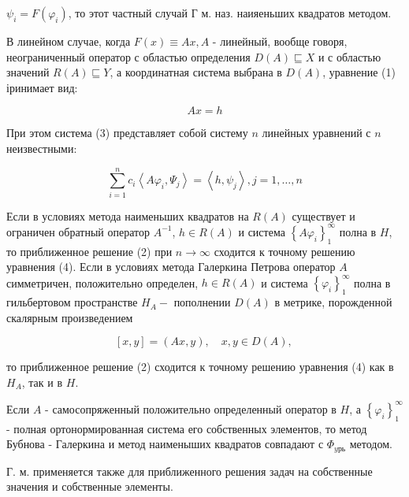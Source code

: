 \documentclass[10pt]{article}
\begin{document}
$\psi_{i}=F\left(\varphi_{i}\right)$, то этот частный случай Г м. наз. наияеньших квадратов методом.



В линейном случае, когда $F(x) \equiv A x, A$ - линейный, вообще говоря, неограниченный оператор с областью определения $D(A) \sqsubseteq X$ и с областью значений $R(A) \sqsubseteq Y$, а координатная система выбрана в $D(A)$, уравнение (1) іринимает вид:



\[

A x=h

\]



При этом система (3) представляет собой систему $n$ линейных уравнений с $n$ неизвестными:



\[

\sum_{i=1}^{n} c_{i}\left\langle A \varphi_{i}, \Psi_{j}\right\rangle=\left\langle h, \psi_{j}\right\rangle, j=1, \ldots, n

\]



Если в условиях метода наименьших квадратов на $R(A)$ существует и ограничен обратный оператор $A^{-1}$, $h \in R(A)$ и система $\left\{A \varphi_{i}\right\}_{1}^{\infty}$ полна в $H$, то приближенное решение (2) при $n \rightarrow \infty$ сходится к точному решению уравнения (4). Если в условиях метода Галеркина Петрова оператор $A$ симметричен, положительно определен, $h \in R(A)$ и система $\left\{\varphi_{i}\right\}_{1}^{\infty}$ полна в гильбертовом пространстве $H_{A}-$ пополнении $D(A)$ в метрике, порожденной скалярным произведением



\[

[x, y]=(A x, y), \quad x, y \in D(A) \text {, }

\]



то приближенное решение (2) сходится к точному решению уравнения (4) как в $H_{A}$, так и в $H$.



Если $A$ - самосопряженный положительно определенный оператор в $H$, а $\left\{\varphi_{i}\right\}_{1}^{\infty}$ - полная ортонормированная система его собственных элементов, то метод Бубнова - Галеркина и метод наименыших квадратов совпадают с $\Phi_{y р ь}$ методом.



Г. м. применяется также для приближенного решения задач на собственные значения и собственные элементы.
\end{document}

